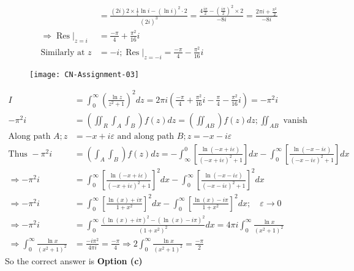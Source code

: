 \begin{enumerate}
\begin{answer}
\begin{align*}
	&=\frac{(2 i) 2 \times \frac{1}{i} \ln i-(\ln i)^{2} \cdot 2}{(2 i)^{3}}=\frac{4 \frac{i \pi}{2}-\left(\frac{i \pi}{2}\right)^{2} \times 2}{-8 i}=\frac{2 \pi i+\frac{\pi^{2}}{2}}{-8 i}\\
	\left.\Rightarrow \operatorname{Res}\right|_{z=i}&=\frac{-\pi}{4}+\frac{\pi^{2}}{16} i\\
	\text{Similarly at }z&=-i ;\left.\operatorname{Res}\right|_{z=-i}=\frac{-\pi}{4}-\frac{\pi^{2}}{16} i
	\end{align*}
	\begin{figure}[H]
		\centering
		\texttt{[image: CN-Assignment-03]}
	\end{figure}
	\begin{align*}
	I&=\int_{0}^{\infty}\left(\frac{\ln z}{z^{2}+1}\right)^{2} d z=2 \pi i\left(\frac{-\pi}{4}+\frac{\pi^{2}}{16} i-\frac{\pi}{4}-\frac{\pi^{2}}{16} i\right)=-\pi^{2} i\\
	-\pi^{2} i&=\left(\iint_{R} \int_{A} \int_{B}\right) f(z) d z=\left(\iint_{A B}\right) f(z) d z ; \iint_{A B}\text{ vanish}\\
	\text{Along path }A ; z&=-x+i \varepsilon\text{ and along path }B ; z=-x-i \varepsilon\\
	\text{Thus }-\pi^{2} i&=\left(\int_{A} \int_{B}\right) f(z) d z=-\int_{\infty}^{0}\left[\frac{\ln (-x+i \varepsilon)}{(-x+i \varepsilon)^{2}+1}\right] d x-\int_{0}^{\infty}\left[\frac{\ln (-x-i \varepsilon)}{(-x-i \varepsilon)^{2}+1}\right] d x\\
	\Rightarrow-\pi^{2} i&=\int_{0}^{\infty}\left[\frac{\ln (-x+i \varepsilon)}{(-x+i \varepsilon)^{2}+1}\right]^{2} d x-\int_{0}^{\infty}\left[\frac{\ln (-x-i \varepsilon)}{(-x-i \varepsilon)^{2}+1}\right]^{2} d x\\
	\Rightarrow-\pi^{2} i&=\int_{0}^{\infty}\left[\frac{\ln (x)+i \pi}{1+x^{2}}\right]^{2} d x-\int_{0}^{\infty}\left[\frac{\ln (x)-i \pi}{1+x^{2}}\right]^{2} d x ; \quad \varepsilon \rightarrow 0\\
	\Rightarrow-\pi^{2} i&=\int_{0}^{\infty} \frac{(\ln (x)+i \pi)^{2}-(\ln (x)-i \pi)^{2}}{\left(1+x^{2}\right)^{2}} d x=4 \pi i \int_{0}^{\infty} \frac{\ln x}{\left(x^{2}+1\right)^{2}}\\
	\Rightarrow \int_{0}^{\infty} \frac{\ln x}{\left(x^{2}+1\right)^{2}}&=\frac{-i \pi^{2}}{4 \pi i}=\frac{-\pi}{4} \Rightarrow 2 \int_{0}^{\infty} \frac{\ln x}{\left(x^{2}+1\right)^{2}}=\frac{-\pi}{2}
	\end{align*}
	So the correct answer is \textbf{Option (c)}
\end{answer}



\end{enumerate}
